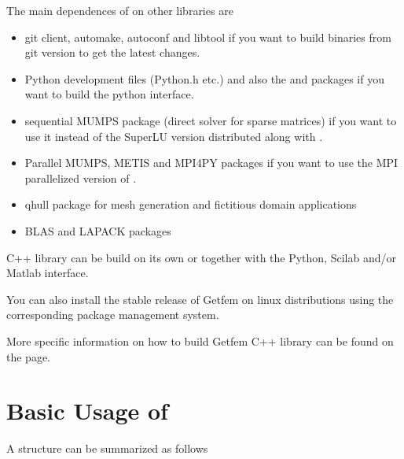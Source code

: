 \documentclass[a4paper,11pt,english]{sphinxmanual}
\begin{document}
\sphinxAtStartPar
The main dependences of  on other libraries are
\begin{itemize}
\item {} 
\sphinxAtStartPar
git client, automake, autoconf and libtool if you  want to build binaries
from git version to get the latest changes.

\item {} 
\sphinxAtStartPar
Python development files (Python.h etc.) and also the  and  packages if
you want to build the python interface.

\item {} 
\sphinxAtStartPar
sequential MUMPS package (direct solver for sparse matrices) if you want to use it instead of the SuperLU version distributed along with .

\item {} 
\sphinxAtStartPar
Parallel MUMPS, METIS and MPI4PY packages if you want to use the MPI parallelized version of .

\item {} 
\sphinxAtStartPar
qhull package for mesh generation and fictitious domain applications

\item {} 
\sphinxAtStartPar
BLAS and LAPACK packages

\end{itemize}

\sphinxAtStartPar
{} C++ library can be build on its own or together with the Python, Scilab and/or Matlab interface.

\sphinxAtStartPar
You can also install the stable release of Getfem on linux distributions using the corresponding package management system.

\sphinxAtStartPar
More specific information on how to build Getfem C++ library can be found on the  page.


\chapter{Basic Usage of }
\label{\detokenize{tutorial/basic_usage:basic-usage-of-gf}}\label{\detokenize{tutorial/basic_usage:tut-bsic-usage}}\label{\detokenize{tutorial/basic_usage::doc}}
\sphinxAtStartPar
A  structure can be summarized as follows
\end{document}
